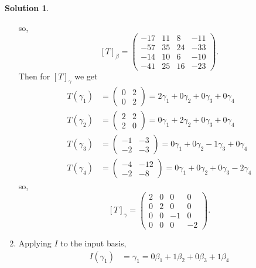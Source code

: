 \documentclass[10pt]{article}
\theoremstyle{definition}
\newtheorem{soln}{Solution}
\begin{document}
\begin{soln}
\begin{enumerate}
          so,
          $$\left[T\right]_\beta=\begin{pmatrix}
              -17 & 11 & 8  & -11 \\
              -57 & 35 & 24 & -33 \\
              -14 & 10 & 6  & -10 \\
              -41 & 25 & 16 & -23
            \end{pmatrix}.$$
          Then for $\left[T\right]_\gamma$ we get
          \begin{align*}
            T(\gamma_1) & =\begin{pmatrix}
                             0 & 2 \\
                             0 & 2
                           \end{pmatrix}=2\gamma_1+0\gamma_2+0\gamma_3+0\gamma_4 \\
            T(\gamma_2) & =\begin{pmatrix}
                             2 & 2 \\
                             2 & 0
                           \end{pmatrix}=0\gamma_1+2\gamma_2+0\gamma_3+0\gamma_4 \\
            T(\gamma_3) & =\begin{pmatrix}
                             -1 & -3 \\
                             -2 & -3
                           \end{pmatrix}=0\gamma_1+0\gamma_2-1\gamma_3+0\gamma_4 \\
            T(\gamma_4) & =\begin{pmatrix}
                             -4 & -12 \\
                             -2 & -8
                           \end{pmatrix}=0\gamma_1+0\gamma_2+0\gamma_3-2\gamma_4
          \end{align*}
          so,
          $$\left[T\right]_\gamma=\begin{pmatrix}
              2 & 0 & 0  & 0  \\
              0 & 2 & 0  & 0  \\
              0 & 0 & -1 & 0  \\
              0 & 0 & 0  & -2
            \end{pmatrix}.$$
    \item Applying $I$ to the input basis,
          \begin{align*}
            I(\gamma_1) & =\gamma_1=0\beta_1+1\beta_2+0\beta_3+1\beta_4 \\

\end{align*}
\end{enumerate}
\end{soln}
\end{document}
